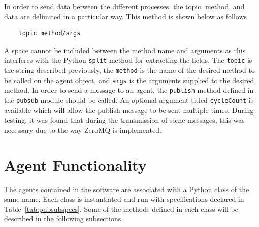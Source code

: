 In order to send data between the different processes, the topic, method, and data are delimited in a particular way. This method is shown below as follows
\begin{verbatim}
    topic method/args
\end{verbatim}
A space cannot be included between the method name and arguments as this interferes with the Python \texttt{split} method for extracting the fields. The \texttt{topic} is the string described previously, the \texttt{method} is the name of the desired method to be called on the agent object, and \texttt{args} is the arguments supplied to the desired method. In order to send a message to an agent, the \texttt{publish} method defined in the \texttt{pubsub} module should be called. An optional argument titled \texttt{cycleCount} is available which will allow the publish message to be sent multiple times. During testing, it was found that during the transmission of some messages, this was necessary due to the way ZeroMQ is implemented. 

\section{Agent Functionality}
The agents contained in the software are associated with a Python class of the same name. Each class is instantiated and run with specifications declared in Table~\ref{tab:pubsubspecs}. Some of the methods defined in each class will be described in the following subsections.

